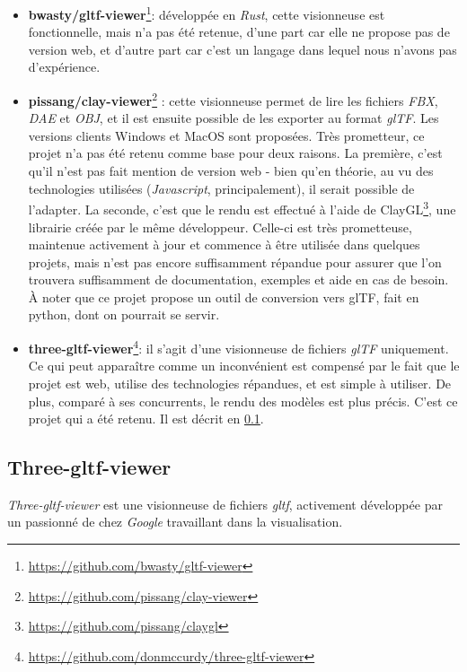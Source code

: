 \begin{itemize}
    \item \textbf{bwasty/gltf-viewer}\footnote{\url{https://github.com/bwasty/gltf-viewer}}: développée en \textit{Rust}, cette visionneuse est fonctionnelle, mais n'a pas été retenue, d'une part car elle ne propose pas de version web, et d'autre part car c'est un langage dans lequel nous n'avons pas d'expérience.
    
    \item \textbf{pissang/clay-viewer}\footnote{\url{https://github.com/pissang/clay-viewer}} : cette visionneuse permet de lire les fichiers \textit{FBX}, \textit{DAE} et \textit{OBJ}, et il est ensuite possible de les exporter au format \textit{glTF}. Les versions clients Windows et MacOS sont proposées. Très prometteur, ce projet n'a pas été retenu comme base pour deux raisons. La première, c'est qu'il n'est pas fait mention de version web - bien qu'en théorie, au vu des technologies utilisées (\textit{Javascript}, principalement), il serait possible de l'adapter. La seconde, c'est que le rendu est effectué à l'aide de ClayGL\footnote{\url{https://github.com/pissang/claygl}}, une librairie créée par le même développeur. Celle-ci est très prometteuse, maintenue activement à jour et commence à être utilisée dans quelques projets, mais n'est pas encore suffisamment répandue pour assurer que l'on trouvera suffisamment de documentation, exemples et aide en cas de besoin.
    À noter que ce projet propose un outil de conversion vers glTF, fait en python, dont on pourrait se servir.
    
    \item \textbf{three-gltf-viewer}\footnote{\url{https://github.com/donmccurdy/three-gltf-viewer}}: il s'agit d'une visionneuse de fichiers \textit{glTF} uniquement. Ce qui peut apparaître comme un inconvénient est compensé par le fait que le projet est web, utilise des technologies répandues, et est simple à utiliser. De plus, comparé à ses concurrents, le rendu des modèles est plus précis. C'est ce projet qui a été retenu. Il est décrit en \ref{sec:three-gltf-viewer}.
\end{itemize}

\subsection{Three-gltf-viewer}
\label{sec:three-gltf-viewer}

\textit{Three-gltf-viewer} est une visionneuse de fichiers \textit{gltf}, activement développée par un passionné de chez \textit{Google} travaillant dans la visualisation.

